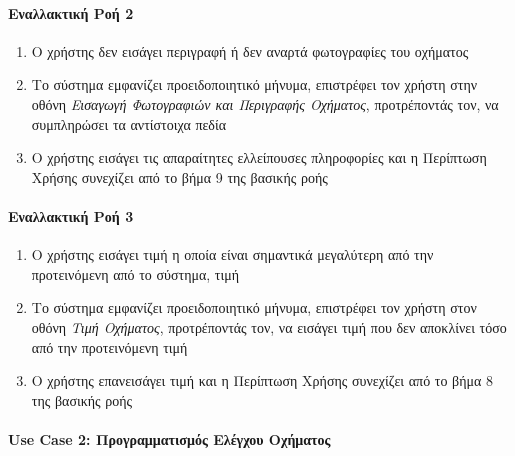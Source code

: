 \documentclass{../ol-softwaremanual}
\begin{document}
	\paragraph{Εναλλακτική Ροή 2}
	
	\begin{enumerate}
		\item Ο χρήστης δεν εισάγει περιγραφή ή δεν αναρτά φωτογραφίες του οχήματος
		\item Το σύστημα εμφανίζει προειδοποιητικό μήνυμα, επιστρέφει τον χρήστη στην οθόνη \textit{Εισαγωγή Φωτογραφιών και Περιγραφής Οχήματος}, προτρέποντάς τον, να συμπληρώσει τα αντίστοιχα πεδία
		\item Ο χρήστης εισάγει τις απαραίτητες ελλείπουσες πληροφορίες και η Περίπτωση Χρήσης συνεχίζει από το βήμα 9 της βασικής ροής
	\end{enumerate}
	
	\paragraph{Εναλλακτική Ροή 3}
	
	\begin{enumerate}
		\item Ο χρήστης εισάγει τιμή η οποία είναι σημαντικά μεγαλύτερη από την προτεινόμενη από το σύστημα, τιμή
		\item Το σύστημα εμφανίζει προειδοποιητικό μήνυμα, επιστρέφει τον χρήστη στον οθόνη \textit{Τιμή Οχήματος}, προτρέποντάς τον, να εισάγει τιμή που δεν αποκλίνει τόσο από την προτεινόμενη τιμή
		\item Ο χρήστης επανεισάγει τιμή και η Περίπτωση Χρήσης συνεχίζει από το βήμα 8 της βασικής ροής
	\end{enumerate}
	
	
	\paragraph{\en Use Case 2: \gr Προγραμματισμός Ελέγχου Οχήματος}
	
\end{document}
